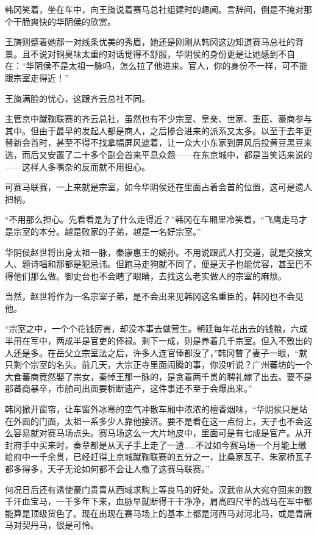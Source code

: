 韩冈笑着，坐在车中，向王旖说着赛马总社组建时的趣闻。言辞间，倒是不掩对那个干脆爽快的华阴侯的欣赏。

王旖则蹙着她那一对线条优美的秀眉，她还是刚刚从韩冈这边知道赛马总社的背景。且不说对铜臭味太重的对话觉得不舒服，华阴侯的身份更是让她感到不自在：“华阴侯不是太祖一脉吗，怎么拉了他进来。官人，你的身份不一样，可不能跟宗室走得近！”

王旖满脸的忧心，这跟齐云总社不同。

主管京中蹴鞠联赛的齐云总社，虽然也有不少宗室、皇亲、世家、重臣、豪商参与其中。但由于最早的发起人都是商人，之后掺合进来的派系又太多。以至于去年更替新会首时，甚至不得不找拿幅屏风遮着，让一众大小东家到屏风后投黄豆黑豆来选，而后又安置了二十多个副会首来平息众怨——在东京城中，都是当笑话来说的——这样人多嘴杂的反而就不用担心。

可赛马联赛，一上来就是宗室，如今华阴侯还在里面占着会首的位置，这可是遗人把柄。

“不用那么担心。先看看是为了什么走得近？”韩冈在车厢里冷笑着，“飞鹰走马才是宗室的本分。越是败家的子弟，越是一名好宗室。”

华阴侯赵世将出身太祖一脉，秦康惠王的嫡孙。不用说跟武人打交道，就是交接文人、题诗唱和那都是犯忌讳。但跑马走狗就不同了，便是天子也能优容，甚至巴不得他们那么做。御史台也不会瞎了眼睛，去找这么老实做人的宗室的麻烦。

当然，赵世将作为一名宗室子弟，是不会出来见韩冈这名重臣的，韩冈也不会见他。

“宗室之中，一个个花钱厉害，却没本事去做营生。朝廷每年花出去的钱粮，六成半用在军中，两成半是官吏的俸禄。剩下一成，则是养着几千宗室。但入不敷出的人还是多。在岳父立宗室法之后，许多人连官俸都没了，”韩冈瞥了妻子一眼，“就只剩个宗室的名头。前几天，大宗正寺里面闹腾的事，你没听说？广州蕃坊的一个大食蕃商竟然娶了宗女，秦悼王那一脉的，是贪着两千贯的聘礼嫁了出去。要不是那蕃商暴卒，市舶司出面要析断遗产，这件事还不至于会爆出来。”

韩冈掀开窗帘，让车窗外冰寒的空气冲散车厢中浓浓的檀香烟味，“华阴侯只是站在外面的门面，太祖一系多少人靠他接济。要不是看在这一点份上，天子也不会这么容易就对赛马场点头。赛马场这么一大片地皮中，里面可是有七成是官产。从开封府手中买来时，奏章都是从天子手上走了一遭……不过如今赛马场一个月能上缴给府中一千余贯，已经赶得上京城蹴鞠联赛的五分之一，比桑家瓦子、朱家桥瓦子都多得多，天子无论如何都不会让人撤了这赛马联赛。”

何况日后还有诱使豪门贵胄从西域求购上等良马的好处。汉武帝从大宛夺回来的数千汗血宝马，一千多年下来，血脉早就断得干干净净，肩高四尺半的战马在军中都能算是顶级货色了。现在出现在赛马场上的基本上都是河西马对河北马，或是青唐马对契丹马，很是可怜。

